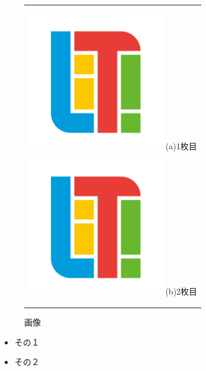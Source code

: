 \documentclass{jsarticle}
\begin{document}
\begin{figure}[H]
\begin{center}
  \begin{tabular}{c}

    \begin{minipage}{0.5\hsize}
      \begin{center}
        \includegraphics[clip, width=60mm]{original.png}
        \hspace{1.6cm} (a)1枚目
      \end{center}
    \end{minipage}

    \begin{minipage}{0.5\hsize}
      \begin{center}
        \includegraphics[clip, width=60mm]{original.png}
        \hspace{1.6cm} (b)2枚目
      \end{center}
    \end{minipage}

  \end{tabular}
  \caption{画像}
  \label{fig:img}
  \end{center}
\end{figure}

\begin{itemize}
  \item その１
  \item その２
\end{itemize}
\end{document}

